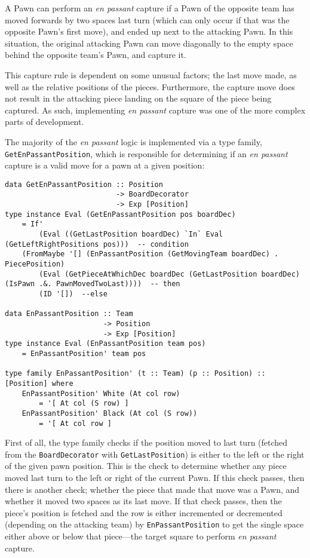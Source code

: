 \documentclass[12pt, a4paper, bibliography=totocnumbered]{scrreprt}
\newcommand{\inline}[1]{\lstinline[basicstyle=\ttfamily\footnotesize]{#1}}
\begin{document}
A Pawn can perform an \emph{en passant} capture if a Pawn of the opposite team has moved forwards by two spaces last turn (which can only occur if that was the opposite Pawn's first move), and ended up next to the attacking Pawn. In this situation, the original attacking Pawn can move diagonally to the empty space behind the opposite team's Pawn, and capture it.


This capture rule is dependent on some unusual factors; the last move made, as well as the relative positions of the pieces. Furthermore, the capture move does not result in the attacking piece landing on the square of the piece being captured. As such, implementing \emph{en passant} capture was one of the more complex parts of development.

The majority of the \emph{en passant} logic is implemented via a type family, \inline{GetEnPassantPosition}, which is responsible for determining if an \emph{en passant} capture is a valid move for a pawn at a given position:

\begin{lstlisting}
data GetEnPassantPosition :: Position
                          -> BoardDecorator
                          -> Exp [Position]
type instance Eval (GetEnPassantPosition pos boardDec)
    = If'
        (Eval ((GetLastPosition boardDec) `In` Eval (GetLeftRightPositions pos)))  -- condition
    (FromMaybe '[] (EnPassantPosition (GetMovingTeam boardDec) . PiecePosition)
        (Eval (GetPieceAtWhichDec boardDec (GetLastPosition boardDec) (IsPawn .&. PawnMovedTwoLast))))  -- then
        (ID '[])  --else

data EnPassantPosition :: Team
                       -> Position
                       -> Exp [Position]
type instance Eval (EnPassantPosition team pos)
    = EnPassantPosition' team pos

type family EnPassantPosition' (t :: Team) (p :: Position) :: [Position] where
    EnPassantPosition' White (At col row)
        = '[ At col (S row) ]
    EnPassantPosition' Black (At col (S row))
        = '[ At col row ]
\end{lstlisting}

First of all, the type family checks if the position moved to last turn (fetched from the \inline{BoardDecorator} with \inline{GetLastPosition}) is either to the left or the right of the given pawn position. This is the check to determine whether any piece moved last turn to the left or right of the current Pawn. If this check passes, then there is another check; whether the piece that made that move was a Pawn, and whether it moved two spaces as its last move. If that check passes, then the piece's position is fetched and the row is either incremented or decremented (depending on the attacking team) by \inline{EnPassantPosition} to get the single space either above or below that piece---the target square to perform \emph{en passant} capture.
\end{document}
